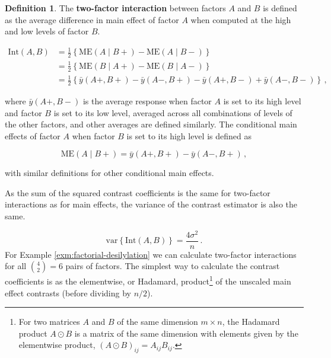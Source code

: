 \documentclass[
]{book}
\theoremstyle{definition}
\newtheorem{definition}{Definition}[chapter]
\theoremstyle{definition}
\theoremstyle{definition}
\theoremstyle{definition}
\theoremstyle{remark}
\begin{document}
\begin{definition}
\protect\hypertarget{def:two-factor-interaction}{}\label{def:two-factor-interaction}The \textbf{two-factor interaction} between factors \(A\) and \(B\) is defined as the average difference in main effect of factor \(A\) when computed at the high and low levels of factor \(B\).

\begin{align*}
\mbox{Int}(A, B) & = \frac{1}{2}\left\{\mbox{ME}(A\mid B+) - \mbox{ME}(A \mid B-)\right\} \\
& = \frac{1}{2}\left\{\mbox{ME}(B \mid A+) - \mbox{ME}(B \mid A-)\right\} \\
& = \frac{1}{2}\left\{\bar{y}(A+, B+) - \bar{y}(A-, B+) - \bar{y}(A+, B-) + \bar{y}(A-, B-)\right\}\,,
\end{align*}

where \(\bar{y}(A+, B-)\) is the average response when factor \(A\) is set to its high level and factor \(B\) is set to its low level, averaged across all combinations of levels of the other factors, and other averages are defined similarly. The conditional main effects of factor \(A\) when factor \(B\) is set to its high level is defined as

\[
\mbox{ME}(A\mid B+) = \bar{y}(A+, B+) - \bar{y}(A-, B+)\,,
\]

with similar definitions for other conditional main effects.
\end{definition}

As the sum of the squared contrast coefficients is the same for two-factor interactions as for main effects, the variance of the contrast estimator is also the same.

\[
\mbox{var}\left\{\mbox{Int}(A, B)\right\} = \frac{4\sigma^2}{n}\,.
\]
For Example \ref{exm:factorial-desilylation} we can calculate two-factor interactions for all \({4 \choose 2} = 6\) pairs of factors. The simplest way to calculate the contrast coefficients is as the elementwise, or Hadamard, product\footnote{For two matrices \(A\) and \(B\) of the same dimension \(m\times n\), the Hadamard product \(A\odot B\) is a matrix of the same dimension with elements given by the elementwise product, \((A\odot B)_{ij} = A_{ij}B_{ij}\).} of the unscaled main effect contrasts (before dividing by \(n/2\)).
\end{document}
